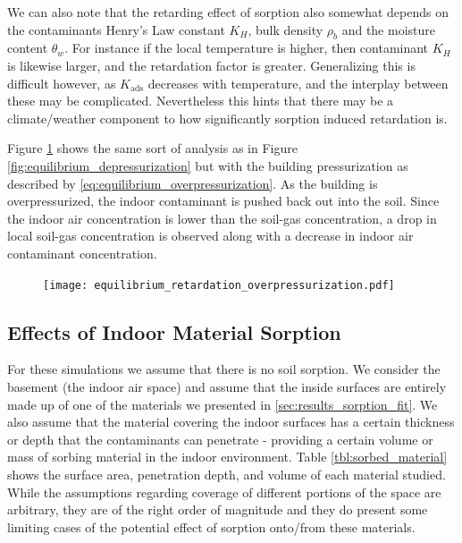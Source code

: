 We can also note that the retarding effect of sorption also somewhat depends on the contaminants Henry's Law constant $K_H$, bulk density $\rho_b$ and the moisture content $\theta_w$.
For instance if the local temperature is higher, then contaminant $K_H$ is likewise larger, and the retardation factor is greater.
Generalizing this is difficult however, as $K_\mathrm{ads}$ decreases with temperature, and the interplay between these may be complicated.
Nevertheless this hints that there may be a climate/weather component to how significantly sorption induced retardation is.\par

Figure \ref{fig:equilibrium_overpressurization} shows the same sort of analysis as in Figure \ref{fig:equilibrium_depressurization} but with the building pressurization as described by \eqref{eq:equilibrium_overpressurization}.
As the building is overpressurized, the indoor contaminant is pushed back out into the soil.
Since the indoor air concentration is lower than the soil-gas concentration, a drop in local soil-gas concentration is observed along with a decrease in indoor air contaminant concentration.\par

\begin{figure}[!htb]
  \texttt{[image: equilibrium\_retardation\_overpressurization.pdf]}
  \caption{}
  \label{fig:equilibrium_overpressurization}
\end{figure}

\subsection{Effects of Indoor Material Sorption}\label{sec:results_indoor_sorption}

For these simulations we assume that there is no soil sorption.
We consider the basement (the indoor air space) and assume that the inside surfaces are entirely made up of one of the materials we presented in \ref{sec:results_sorption_fit}.
We also assume that the material covering the indoor surfaces has a certain thickness or depth that the contaminants can penetrate - providing a certain volume or mass of sorbing material in the indoor environment.
Table \ref{tbl:sorbed_material} shows the surface area, penetration depth, and volume of each material studied.
While the assumptions regarding coverage of different portions of the space are arbitrary, they are of the right order of magnitude and they do present some limiting cases of the potential effect of sorption onto/from these materials.\par

